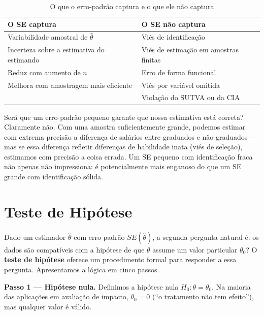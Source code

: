 \begin{table}[H]
\centering
\caption{O que o erro-padrão captura e o que ele não captura}
\label{tab:se_captura}
\begin{tabular}{ll}
\toprule
\textbf{O SE captura} & \textbf{O SE não captura} \\
\midrule
Variabilidade amostral de $\hat{\theta}$ & Viés de identificação \\
Incerteza sobre a estimativa do estimando & Viés de estimação em amostras finitas \\
Reduz com aumento de $n$ & Erro de forma funcional \\
Melhora com amostragem mais eficiente & Viés por variável omitida \\
& Violação do SUTVA ou da CIA \\
\bottomrule
\end{tabular}

\vspace{4pt}
\end{table}

Será que um erro-padrão pequeno garante que nossa estimativa está correta? Claramente não. Com uma amostra suficientemente grande, podemos estimar com extrema precisão a diferença de salários entre graduados e não-graduados — mas se essa diferença refletir diferenças de habilidade inata (viés de seleção), estimamos com precisão a coisa errada. Um SE pequeno com identificação fraca não apenas não impressiona: é potencialmente mais enganoso do que um SE grande com identificação sólida.


\section{Teste de Hipótese}
\label{sec:teste_hipotese}

Dado um estimador $\hat{\theta}$ com erro-padrão $SE(\hat{\theta})$, a segunda pergunta natural é: os dados são compatíveis com a hipótese de que $\theta$ assume um valor particular $\theta_0$? O \textbf{teste de hipótese} oferece um procedimento formal para responder a essa pergunta. Apresentamos a lógica em cinco passos.

\medskip
\noindent\textbf{Passo 1 — Hipótese nula.} Definimos a hipótese nula $H_0: \theta = \theta_0$. Na maioria das aplicações em avaliação de impacto, $\theta_0 = 0$ (``o tratamento não tem efeito''), mas qualquer valor é válido.

